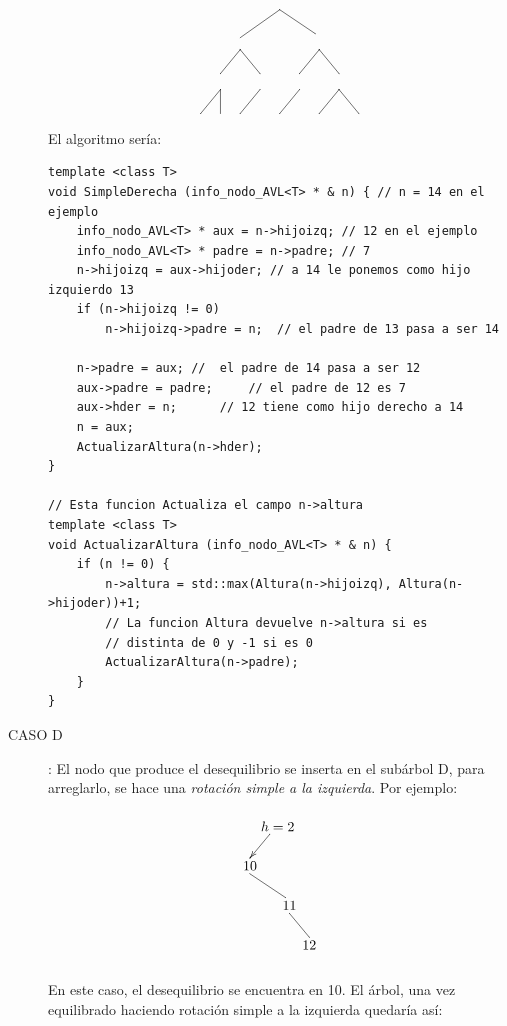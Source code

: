 \documentclass[10pt,a4paper,spanish]{report}
\begin{document}
\begin{description}
\[\begin{xy}
	\ar@{-} (0,-2);(-10,-9) %
	\ar@{-} (0,-2);(9,-8) %
	\ar@{-} (-10,-12);(-15,-18) %
	\ar@{-} (10,-12);(5,-18) %
	\ar@{-} (10,-12);(15,-18) %
	\ar@{-} (-15,-22);(-20,-28)
	\ar@{-} (-15,-22);(-15,-28)
	\ar@{-} (-10,-12);(-5,-18) %
	\ar@{-} (-5,-22);(-10,-28) %
	\ar@{-} (5,-22);(0,-28)
	\ar@{-} (15,-22);(10,-28) %
	\ar@{-} (15,-22);(20,-28)
	\end{xy}\]

	\noindent
	El algoritmo sería:
\begin{verbatim}
template <class T>
void SimpleDerecha (info_nodo_AVL<T> * & n) { // n = 14 en el ejemplo
	info_nodo_AVL<T> * aux = n->hijoizq; // 12 en el ejemplo
	info_nodo_AVL<T> * padre = n->padre; // 7
	n->hijoizq = aux->hijoder; // a 14 le ponemos como hijo izquierdo 13
	if (n->hijoizq != 0)
		n->hijoizq->padre = n;	// el padre de 13 pasa a ser 14

	n->padre = aux;	//  el padre de 14 pasa a ser 12
	aux->padre = padre;		// el padre de 12 es 7
	aux->hder = n;		// 12 tiene como hijo derecho a 14
	n = aux;
	ActualizarAltura(n->hder);
}

// Esta funcion Actualiza el campo n->altura
template <class T>
void ActualizarAltura (info_nodo_AVL<T> * & n) {
	if (n != 0) {
		n->altura = std::max(Altura(n->hijoizq), Altura(n->hijoder))+1;
		// La funcion Altura devuelve n->altura si es 
		// distinta de 0 y -1 si es 0
		ActualizarAltura(n->padre);
	}
}
\end{verbatim}

	\item[CASO D]: El nodo que produce el desequilibrio se inserta en el subárbol D, para arreglarlo, se hace una \textit{\textcolor[rgb]{0.3,0.4,0.8}{rotación simple a la izquierda}}. Por ejemplo:
    \[\begin{xy}
	,(0,0)*+=<10mm>[]\txt<2cm>{10}
	,(7,10)*+=<10mm>[]\txt<2cm>{$h=2$}
	,(10,-10)*+=<10mm>[]\txt<2cm>{11}
	,(15,-20)*+=<10mm>[]\txt<2cm>{12}

	\ar@{<-} (5,8);(0,2);
	\ar@{-} (0,-2);(9,-8) %
	\ar@{-} (10,-12);(15,-18) %
	\end{xy}\]

	\noindent
	En este caso, el desequilibrio se encuentra en 10. El árbol, una vez equilibrado haciendo rotación simple a la izquierda quedaría así:


\end{description}
\end{document}
